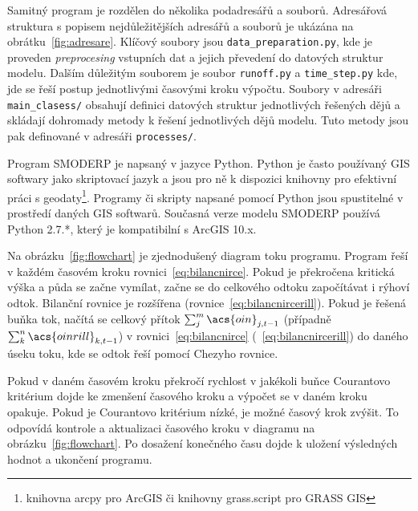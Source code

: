 

Samitný program je rozdělen do několika podadresářů a souborů. Adresářová struktura s popisem nejdůležitějších adresářů a souborů je ukázána na obrátku~\ref{fig:adresare}. Klíčový soubory jsou {\tt data\_preparation.py}, kde je proveden {\it preprocesing} vstupních dat a jejich převedení do datových struktur modelu. Dalším důležitým souborem je soubor {\tt runoff.py} a {\tt time\_step.py} kde, jde se řeší postup jednotlivými časovými kroku výpočtu. Soubory v adresáři {\tt main\_clasess/} obsahují definici datových struktur jednotlivých řešených dějů a skládají dohromady metody k řešení jednotlivých dějů modelu. Tuto metody jsou pak definované v adresáři {\tt processes/}. 

Program SMODERP je napsaný v jazyce Python. Python je často používaný GIS softwary jako skriptovací jazyk a jsou pro ně k dispozici knihovny pro efektivní práci s geodaty\footnote{knihovna arcpy pro ArcGIS či knihovny grass.script pro GRASS GIS}. Programy či skripty napsané pomocí Python jsou spustitelné v prostředí daných GIS softwarů. Současná verze modelu SMODERP používá Python 2.7.*, který je kompatibilní s ArcGIS 10.x.

Na obrázku~\ref{fig:flowchart} je zjednodušený diagram toku programu. Program řeší v každém časovém kroku rovnici~\ref{eq:bilancnirce}. Pokud je překročena kritická výška a půda se začne vymílat, začne se do celkového  odtoku  započítávat i rýhoví odtok. Bilanční rovnice je rozšířena (rovnice~\ref{eq:bilancnircerill}). Pokud je řešená buňka tok, načítá se celkový přítok $\sum_j^m \acs{oin}_{j,t-1}$ (případně $\sum_k^n \acs{oinrill}_{k,t-1}$) v rovnici~\ref{eq:bilancnirce} (~\ref{eq:bilancnircerill}) do daného úseku toku, kde se odtok řeší pomocí Chezyho rovnice.

Pokud v daném časovém kroku překročí rychlost v jakékoli buňce Courantovo kritérium dojde ke zmenšení časového kroku a výpočet se v daném kroku opakuje. Pokud je Courantovo kritérium nízké, je možné časový krok zvýšit. To odpovídá kontrole a aktualizaci časového kroku v diagramu na obrázku~\ref{fig:flowchart}. Po dosažení konečného času dojde k uložení výsledných hodnot a ukončení programu.






% 
% 

